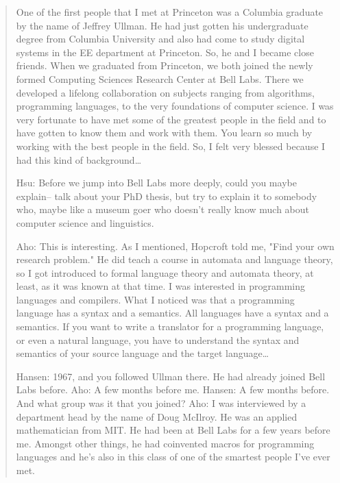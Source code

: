 \begin{quotation}
One of the first people that I met at Princeton was a Columbia graduate by the 
name of Jeffrey Ullman. He had just gotten his undergraduate degree from 
Columbia University and also had come to study digital systems in the EE 
department at Princeton. So, he and I became close friends. When we graduated 
from Princeton, we both joined the newly formed Computing Sciences Research 
Center at Bell Labs. There we developed a lifelong collaboration on subjects 
ranging from algorithms, programming languages, to the very foundations of 
computer science. I was very fortunate to have met some of the greatest people 
in the field and to have gotten to know them and work with them. You learn so 
much by working with the best people in the field. So, I felt very blessed 
because I had this kind of background\dots

Hsu: Before we jump into Bell Labs more deeply, could you maybe explain-- talk about your PhD thesis,
but try to explain it to somebody who, maybe like a museum goer who doesn't really know much about
computer science and linguistics.

Aho: This is interesting. As I mentioned, Hopcroft told me, "Find your own research problem." He did
teach a course in automata and language theory, so I got introduced to formal language theory and
automata theory, at least, as it was known at that time. I was interested in programming languages and
compilers. What I noticed was that a programming language has a syntax and a semantics. All languages
have a syntax and a semantics. If you want to write a translator for a programming language, or even a
natural language, you have to understand the syntax and semantics of your source language and the
target language\dots

Hansen: 1967, and you followed Ullman there. He had already joined Bell Labs before.
Aho: A few months before me.
Hansen: A few months before. And what group was it that you joined?
Aho: I was interviewed by a department head by the name of Doug McIlroy. He was an applied
mathematician from MIT. He had been at Bell Labs for a few years before me. Amongst other things, he
had coinvented macros for programming languages and he's also in this class of one of the smartest
people I've ever met. 


\end{quotation}
